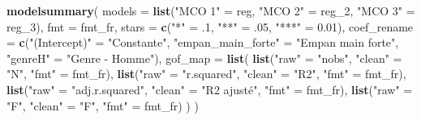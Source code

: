 \documentclass[
  11pt,
]{book}
\newenvironment{Shaded}{\begin{snugshade}}{\end{snugshade}}
\newcommand{\AttributeTok}[1]{\textcolor[rgb]{0.13,0.29,0.53}{#1}}
\newcommand{\DecValTok}[1]{\textcolor[rgb]{0.00,0.00,0.81}{#1}}
\newcommand{\FloatTok}[1]{\textcolor[rgb]{0.00,0.00,0.81}{#1}}
\newcommand{\FunctionTok}[1]{\textcolor[rgb]{0.13,0.29,0.53}{\textbf{#1}}}
\newcommand{\NormalTok}[1]{#1}
\newcommand{\OtherTok}[1]{\textcolor[rgb]{0.56,0.35,0.01}{#1}}
\newcommand{\StringTok}[1]{\textcolor[rgb]{0.31,0.60,0.02}{#1}}
\numberwithin{equation}{section}
\numberwithin{countremarque}{section}
\begin{document}
\begin{Shaded}
\begin{Highlighting}[]
\FunctionTok{modelsummary}\NormalTok{(}
  \AttributeTok{models =} \FunctionTok{list}\NormalTok{(}\StringTok{"MCO 1"} \OtherTok{=}\NormalTok{ reg,}
                \StringTok{"MCO 2"} \OtherTok{=}\NormalTok{ reg\_2,}
                \StringTok{"MCO 3"} \OtherTok{=}\NormalTok{ reg\_3),}
  \AttributeTok{fmt =}\NormalTok{ fmt\_fr,}
  \AttributeTok{stars =} \FunctionTok{c}\NormalTok{(}\StringTok{"*"} \OtherTok{=}\NormalTok{ .}\DecValTok{1}\NormalTok{, }\StringTok{"**"} \OtherTok{=}\NormalTok{ .}\DecValTok{05}\NormalTok{, }\StringTok{"***"} \OtherTok{=} \FloatTok{0.01}\NormalTok{),}
  \AttributeTok{coef\_rename =} \FunctionTok{c}\NormalTok{(}\StringTok{"(Intercept)"} \OtherTok{=} \StringTok{"Constante"}\NormalTok{,}
                  \StringTok{"empan\_main\_forte"} \OtherTok{=} \StringTok{"Empan main forte"}\NormalTok{,}
                  \StringTok{"genreH"} \OtherTok{=} \StringTok{"Genre {-} Homme"}\NormalTok{),}
  \AttributeTok{gof\_map =} \FunctionTok{list}\NormalTok{(}
    \FunctionTok{list}\NormalTok{(}\StringTok{"raw"} \OtherTok{=} \StringTok{"nobs"}\NormalTok{, }\StringTok{"clean"} \OtherTok{=} \StringTok{"N"}\NormalTok{, }\StringTok{"fmt"} \OtherTok{=}\NormalTok{ fmt\_fr),}
    \FunctionTok{list}\NormalTok{(}\StringTok{"raw"} \OtherTok{=} \StringTok{"r.squared"}\NormalTok{, }\StringTok{"clean"} \OtherTok{=} \StringTok{"R2"}\NormalTok{, }\StringTok{"fmt"} \OtherTok{=}\NormalTok{ fmt\_fr),}
    \FunctionTok{list}\NormalTok{(}\StringTok{"raw"} \OtherTok{=} \StringTok{"adj.r.squared"}\NormalTok{, }\StringTok{"clean"} \OtherTok{=} \StringTok{"R2 ajusté"}\NormalTok{, }\StringTok{"fmt"} \OtherTok{=}\NormalTok{ fmt\_fr),}
    \FunctionTok{list}\NormalTok{(}\StringTok{"raw"} \OtherTok{=} \StringTok{"F"}\NormalTok{, }\StringTok{"clean"} \OtherTok{=} \StringTok{"F"}\NormalTok{, }\StringTok{"fmt"} \OtherTok{=}\NormalTok{ fmt\_fr)}
\NormalTok{  )}
\NormalTok{)}
\end{Highlighting}
\end{Shaded}
\end{document}
